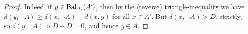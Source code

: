 \documentclass{amsart}
\begin{document}
\begin{proof}
        Indeed, if $y\in\operatorname{Ball}_D(A')$, then by the (reverse) triangle-inequality we have $d(y,\lnot A)\geq d(x,\lnot A)-d(x,y)$ for all $x\in A'$. But $d(x,\lnot A)>D$, strictly, so $d(y,\lnot A)>D-D=0$, and hence $y\in A$.
    \end{proof}
\end{document}
